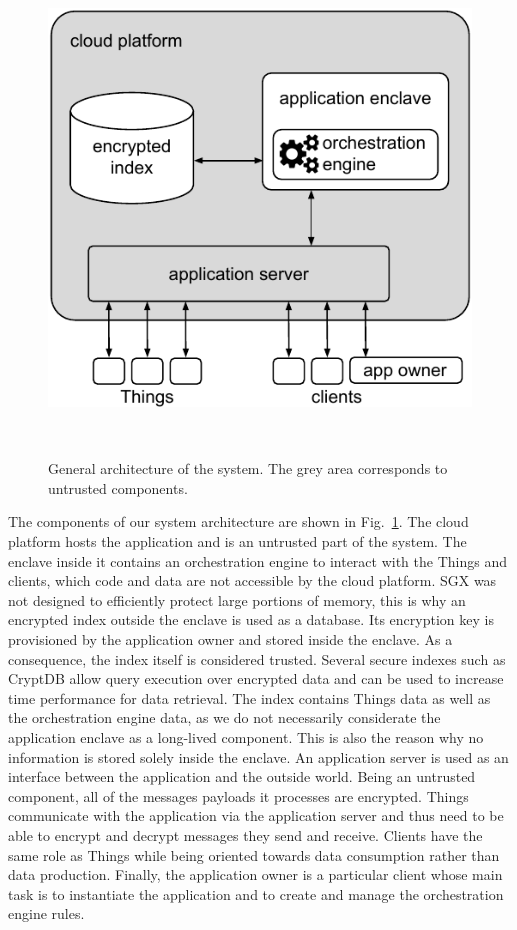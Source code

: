 \documentclass{sigchi}
\begin{document}
\begin{figure}
\centering
  \includegraphics[width=0.8\columnwidth]{figures/system_pdf}
  \caption{General architecture of the system. The grey area corresponds to untrusted components. }~\label{fig:architecture}
\end{figure}

The components of our system architecture are shown in Fig.~\ref{fig:architecture}. The cloud platform hosts the application and is an untrusted part of the system. The enclave inside it contains an orchestration engine to interact with the Things and clients, which code and data are not accessible by the cloud platform. SGX was not designed to efficiently protect large portions of memory, this is why an encrypted index outside the enclave is used as a database. Its encryption key is provisioned by the application owner and stored inside the enclave. As a consequence, the index itself is considered trusted. Several secure indexes such as CryptDB \cite{popa_cryptdb} allow query execution over encrypted data and can be used to increase time performance for data retrieval. The index contains Things data as well as the orchestration engine data, as we do not necessarily considerate the application enclave as a long-lived component. This is also the reason why no information is stored solely inside the enclave. An application server is used as an interface between the application and the outside world. Being an untrusted component, all of the messages payloads it processes are encrypted. Things communicate with the application via the application server and thus need to be able to encrypt and decrypt messages they send and receive. Clients have the same role as Things while being oriented towards data consumption rather than data production. Finally, the application owner is a particular client whose main task is to instantiate the application and to create and manage the orchestration engine rules.
\end{document}
